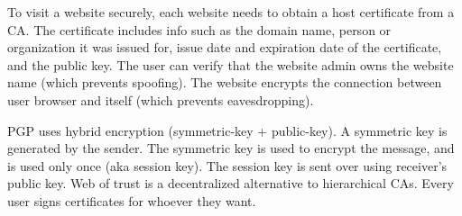 To visit a website securely, each website needs to obtain a host 
certificate from a CA.
The certificate includes info such as the domain name, 
person or organization it
was issued for, issue date and expiration date of the 
certificate, and the public key.
The user can verify that the website admin owns the website name 
(which prevents spoofing).
The website encrypts the connection between user browser and itself 
(which prevents eavesdropping).

PGP uses hybrid encryption
(symmetric-key + public-key).
A symmetric key is generated by the sender.
The symmetric key is used to encrypt the
message, and is used only once (aka
session key).
The session key is sent over using
receiver's public key.
Web of trust is a decentralized
alternative to hierarchical CAs.
Every user signs certificates for whoever they
want.